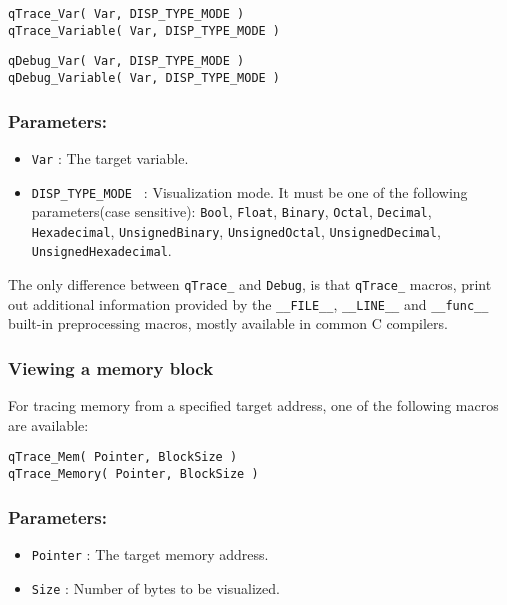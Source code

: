 \begin{lstlisting}[style=CStyle]
qTrace_Var( Var, DISP_TYPE_MODE )
qTrace_Variable( Var, DISP_TYPE_MODE )
\end{lstlisting}
\begin{lstlisting}[style=CStyle]
qDebug_Var( Var, DISP_TYPE_MODE )
qDebug_Variable( Var, DISP_TYPE_MODE )
\end{lstlisting}

\subsubsection*{Parameters:}
\begin{itemize}
    \item \lstinline{Var} : The target variable. 
    \item \lstinline{DISP_TYPE_MODE } :  Visualization mode. It must be one of the following parameters(case sensitive): \lstinline{Bool}, \lstinline{Float}, \lstinline{Binary}, \lstinline{Octal}, \lstinline{Decimal}, \lstinline{Hexadecimal}, \lstinline{UnsignedBinary}, \lstinline{UnsignedOctal}, \lstinline{UnsignedDecimal}, \lstinline{UnsignedHexadecimal}. 
\end{itemize}

The only difference between \lstinline{qTrace_} and  \lstinline{Debug}, is that \lstinline{qTrace_} macros, print out additional information provided by the \lstinline{__FILE__}, \lstinline{__LINE__} and \lstinline{__func__} built-in preprocessing macros, mostly available in common C compilers. 

\subsubsection{Viewing a memory block}
For tracing memory from a specified target address, one of the following macros are available:  

\begin{lstlisting}[style=CStyle]
qTrace_Mem( Pointer, BlockSize )
qTrace_Memory( Pointer, BlockSize )
\end{lstlisting}

\subsubsection*{Parameters:}
\begin{itemize}
    \item \lstinline{Pointer} : The target memory address.
    \item \lstinline{Size} : Number of bytes to be visualized.
\end{itemize}

